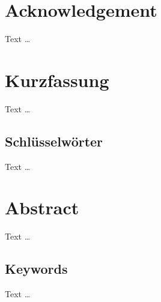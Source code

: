 \chapter*{Acknowledgement}
\begin{comment}
Kurzer Dank an Personen, die Sie bei der Arbeit unterstützt haben. Z. B. inoffizielle Betreuer, Teilnehmer an den Evaluationen (nie namentlich nennen), Medientechnik, Sekretärin, etc. pp. — nur wenn Sie den Personen wirklich dankbar sind. (Ist nett aber für die Bewertung irrelevant.)
Falls nicht verwendet diese Seite einfach entfernen.
\end{comment}

Text \dots

\newpage
\chapter*{Kurzfassung}
\begin{comment}
Abstract schon für Zwischenabgabe schreiben. Später kommen dann noch Sätze dazu, aber Grundgerüst steht.

Kein "Teaser" sondern eine kurze Zusammenfassung (das, was man braucht, um sich schnell einen Überblick zu verschaffen, ob es sich lohnt, die Arbeit zu lesen).

Inhalt umfasst die zentralen Punkte aller Kapitel, von Ziel/Fragestellung bis Ausblick.

Nie länger als diese eine Seite (inkl. Schlüsselwörter).
\end{comment}

Text \dots

\section*{Schlüsselwörter}
\begin{comment}
Verwendete Literatur gibt Hinweise auf passende Stichwörter. Das sind die Suchbegriffe, die man bei einer Literatursuche verwenden würde.
\end{comment}

Text \dots

\newpage
\chapter*{Abstract}
\begin{comment}
Englische Version der Kurzfassung.
Nicht einfach Google Translate oder DeepL verwenden. Trifft die Nuancen nicht und klingt z. T. nach Yoda.
\end{comment}

Text \dots

\section*{Keywords}
Text \dots

\newpage